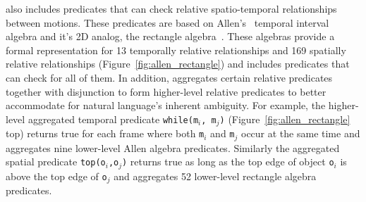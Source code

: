 
\dslname{} also includes predicates that can check relative
spatio-temporal relationships between motions.
%
These predicates are based on Allen's~
temporal interval algebra and it's 2D analog, the rectangle
algebra~\cite{balbiani1998model,navarrete2013spatial}.
%
These algebras provide a formal representation for 13 temporally
relative relationships and 169 spatially relative relationships (Figure~\ref{fig:allen_rectangle}) and
\dslname{} includes predicates that can check for all of them.
%
In addition, \dslname{} aggregates certain relative predicates together with
disjunction to form higher-level relative predicates to better accommodate for natural
language's inherent ambiguity.
%
For example, the higher-level aggregated temporal predicate
\texttt{while(m$_i$, m$_j$)} (Figure~\ref{fig:allen_rectangle} top)
returns true
for each frame where both {\tt m$_i$} and {\tt m$_j$}  occur at the same time and aggregates
nine lower-level Allen algebra predicates.
%
%
Similarly the aggregated spatial predicate {\tt top(o$_i$,o$_j$)}
returns true as long as the top edge of object {\tt o$_i$} is above
the top edge of {\tt o$_j$} and aggregates 52 lower-level rectangle
algebra predicates.


